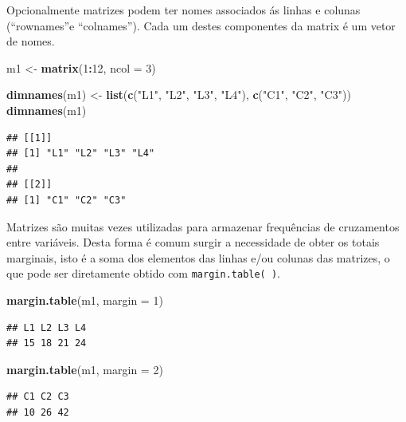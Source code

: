 \documentclass[
]{book}
\newenvironment{Shaded}{\begin{snugshade}}{\end{snugshade}}
\newcommand{\DataTypeTok}[1]{\textcolor[rgb]{0.13,0.29,0.53}{#1}}
\newcommand{\DecValTok}[1]{\textcolor[rgb]{0.00,0.00,0.81}{#1}}
\newcommand{\KeywordTok}[1]{\textcolor[rgb]{0.13,0.29,0.53}{\textbf{#1}}}
\newcommand{\NormalTok}[1]{#1}
\newcommand{\OperatorTok}[1]{\textcolor[rgb]{0.81,0.36,0.00}{\textbf{#1}}}
\newcommand{\StringTok}[1]{\textcolor[rgb]{0.31,0.60,0.02}{#1}}
\begin{document}
Opcionalmente matrizes podem ter nomes associados ás linhas e colunas (``rownames''e ``colnames''). Cada um destes componentes da matrix é um vetor de nomes.

\begin{Shaded}
\begin{Highlighting}[]
\NormalTok{m1 <-}\StringTok{ }\KeywordTok{matrix}\NormalTok{(}\DecValTok{1}\OperatorTok{:}\DecValTok{12}\NormalTok{, }\DataTypeTok{ncol =} \DecValTok{3}\NormalTok{) }

\KeywordTok{dimnames}\NormalTok{(m1) <-}\StringTok{ }\KeywordTok{list}\NormalTok{(}\KeywordTok{c}\NormalTok{(}\StringTok{"L1"}\NormalTok{, }\StringTok{"L2"}\NormalTok{, }\StringTok{"L3"}\NormalTok{, }\StringTok{"L4"}\NormalTok{), }\KeywordTok{c}\NormalTok{(}\StringTok{"C1"}\NormalTok{, }\StringTok{"C2"}\NormalTok{, }\StringTok{"C3"}\NormalTok{)) }
\KeywordTok{dimnames}\NormalTok{(m1)}
\end{Highlighting}
\end{Shaded}

\begin{verbatim}
## [[1]]
## [1] "L1" "L2" "L3" "L4"
## 
## [[2]]
## [1] "C1" "C2" "C3"
\end{verbatim}

Matrizes são muitas vezes utilizadas para armazenar frequências de cruzamentos entre variáveis. Desta forma é comum surgir a necessidade de obter os totais marginais, isto é a soma dos elementos das linhas e/ou colunas das matrizes, o que pode ser diretamente obtido com \texttt{margin.table(\ )}.

\begin{Shaded}
\begin{Highlighting}[]
 \KeywordTok{margin.table}\NormalTok{(m1, }\DataTypeTok{margin =} \DecValTok{1}\NormalTok{)}
\end{Highlighting}
\end{Shaded}

\begin{verbatim}
## L1 L2 L3 L4 
## 15 18 21 24
\end{verbatim}

\begin{Shaded}
\begin{Highlighting}[]
 \KeywordTok{margin.table}\NormalTok{(m1, }\DataTypeTok{margin =} \DecValTok{2}\NormalTok{)}
\end{Highlighting}
\end{Shaded}

\begin{verbatim}
## C1 C2 C3 
## 10 26 42
\end{verbatim}
\end{document}
